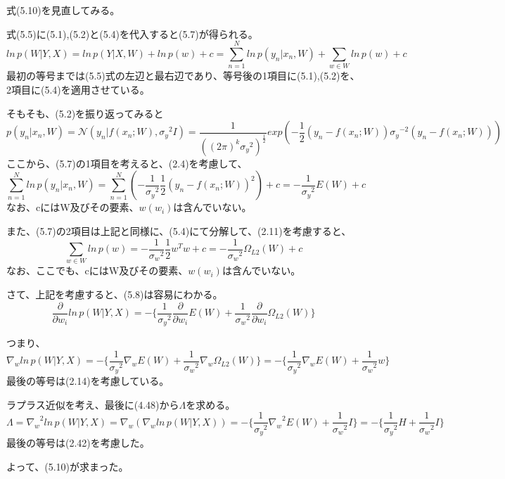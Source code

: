 \documentclass{jsarticle}
\begin{document}
式(5.10)を見直してみる。

式(5.5)に(5.1),(5.2)と(5.4)を代入すると(5.7)が得られる。
\begin{equation}
ln \, p(W|Y,X) = ln \, p(Y|X,W) + ln \, p(w)+ c = \sum_{n = 1}^N ln \, p(y_n|x_n, W) + \sum_{w \in W} ln \, p(w) + c
\end{equation}
最初の等号までは(5.5)式の左辺と最右辺であり、等号後の1項目に(5.1),(5.2)を、2項目に(5.4)を適用させている。

そもそも、(5.2)を振り返ってみると
\begin{equation}
p(y_n | x_n, W) = \mathcal{N}(y_n | f(x_n; W), {\sigma_y}^2I) = \frac{1}{({{(2 \pi)}^k {\sigma_y}^2})^{\frac{1}{2}}}exp(-\frac{1}{2}(y_n - f(x_n;W)){\sigma_y}^{-2}(y_n - f(x_n;W)))
\end{equation}
ここから、(5.7)の1項目を考えると、(2.4)を考慮して、
\begin{equation}
\sum_{n = 1}^N ln \, p(y_n|x_n, W) = \sum_{n = 1}^N (-\frac{1}{{\sigma_y}^2}\frac{1}{2}(y_n - f(x_n;W))^2) + c = -\frac{1}{{\sigma_y}^2} E(W) + c
\end{equation}
なお、cにはW及びその要素、$w(w_i)$は含んでいない。

また、(5.7)の2項目は上記と同様に、(5.4)にて分解して、(2.11)を考慮すると、
\begin{equation}
\sum_{w \in W} ln \, p(w) = -\frac{1}{{\sigma_w}^2}\frac{1}{2}w^T w + c = -\frac{1}{{\sigma_w}^2} \Omega_{L2}(W) + c
\end{equation}
なお、ここでも、cにはW及びその要素、$w(w_i)$は含んでいない。

さて、上記を考慮すると、(5.8)は容易にわかる。
\begin{equation}
\frac{\partial}{\partial w_i} ln \, p(W|Y,X) = -\{\frac{1}{{\sigma_y}^2} \frac{\partial}{\partial w_i}E(W) + \frac{1}{{\sigma_w}^2} \frac{\partial}{\partial w_i}\Omega_{L2}(W)\}
\end{equation}

つまり、
\begin{equation}
\nabla_w ln \, p(W|Y,X) = -\{\frac{1}{{\sigma_y}^2} \nabla_w E(W) + \frac{1}{{\sigma_w}^2} \nabla_w \Omega_{L2}(W)\} = -\{\frac{1}{{\sigma_y}^2} \nabla_w E(W) + \frac{1}{{\sigma_w}^2} w \}
\end{equation}
最後の等号は(2.14)を考慮している。

ラプラス近似を考え、最後に(4.48)から$\Lambda$を求める。
\begin{equation}
\Lambda = {\nabla_w}^2 ln \, p(W|Y,X) = \nabla_w (\nabla_w ln \, p(W|Y,X)) = -\{\frac{1}{{\sigma_y}^2} {\nabla_w}^2 E(W) + \frac{1}{{\sigma_w}^2} I \} = -\{\frac{1}{{\sigma_y}^2} H + \frac{1}{{\sigma_w}^2} I \}
\end{equation}
最後の等号は(2.42)を考慮した。

よって、(5.10)が求まった。
\end{document}
